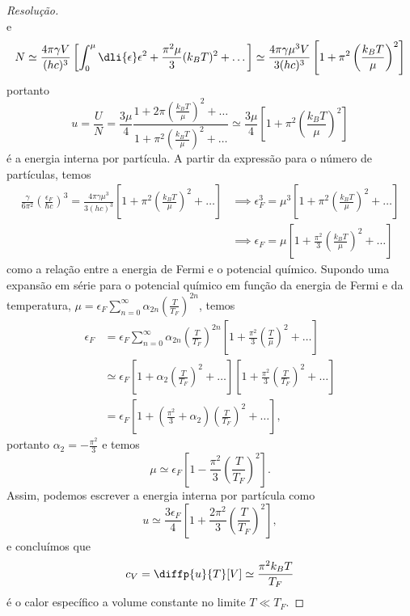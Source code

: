 \begin{proof}[Resolução]
\begin{equation*}
    \end{equation*}
    e
    \begin{equation*}
        N \simeq \frac{4\pi \gamma V}{(hc)^3} \left[\int_0^\mu \dli{\epsilon} \epsilon^2 + \frac{\pi^2\mu}{3} (k_B T)^2 + \dots\right] \simeq \frac{4\pi \gamma \mu^3 V}{3(hc)^3}\left[1 + \pi^2 \left(\frac{k_BT}{\mu}\right)^2\right]
    \end{equation*}
    portanto
    \begin{equation*}
        u = \frac{U}{N} = \frac{3\mu}{4}\frac{1 + 2\pi\left(\frac{k_B T}{\mu}\right)^2 + \dots}{1 + \pi^2\left(\frac{k_B T}{\mu}\right)^2 + \dots} \simeq \frac{3\mu}{4} \left[1 + \pi^2 \left(\frac{k_B T}{\mu}\right)^2\right]
    \end{equation*}
    é a energia interna por partícula. A partir da expressão para o número de partículas, temos
    \begin{align*}
        \frac{\gamma}{6\pi^2}\left(\frac{\epsilon_F}{\hbar c}\right)^3 = \frac{4\pi \gamma \mu^3}{3(hc)^3}\left[1 + \pi^2\left(\frac{k_B T}{\mu}\right)^2 + \dots \right]
        &\implies \epsilon_F^3 = \mu^3 \left[1 + \pi^2\left(\frac{k_B T}{\mu}\right)^2 + \dots\right]\\
        &\implies \epsilon_F =  \mu \left[1 + \frac{\pi^2}{3}\left(\frac{k_B T}{\mu}\right)^2 + \dots\right]
    \end{align*}
    como a relação entre a energia de Fermi e o potencial químico. Supondo uma expansão em série para o potencial químico em função da energia de Fermi e da temperatura, \(\mu = \epsilon_F \sum_{n = 0}^\infty \alpha_{2n} \left(\frac{T}{T_F}\right)^{2n}\), temos
    \begin{align*}
        \epsilon_F &= \epsilon_F\sum_{n = 0}^\infty \alpha_{2n} \left(\frac{T}{T_F}\right)^{2n}\left[1 + \frac{\pi^2}{3}\left(\frac{T}{\mu}\right)^2 + \dots\right]\\
                   &\simeq \epsilon_F\left[1 + \alpha_2 \left(\frac{T}{T_F}\right)^2 + \dots\right]\left[1 + \frac{\pi^2}{3}\left(\frac{T}{T_F}\right)^2 + \dots \right]\\
                   &= \epsilon_F\left[1 + \left(\frac{\pi^2}{3} + \alpha_2\right)\left(\frac{T}{T_F}\right)^2 + \dots \right],
    \end{align*}
    portanto \(\alpha_2 =-\frac{\pi^2}{3}\) e temos
    \begin{equation*}
        \mu \simeq \epsilon_F\left[1 - \frac{\pi^2}{3}\left(\frac{T}{T_F}\right)^2\right].
    \end{equation*}
    Assim, podemos escrever a energia interna por partícula como
    \begin{equation*}
        u \simeq \frac{3 \epsilon_F}{4}\left[1 + \frac{2\pi^2}{3}\left(\frac{T}{T_F}\right)^2\right],
    \end{equation*}
    e concluímos que
    \begin{equation*}
        c_V = \diffp{u}{T}[V] \simeq \frac{\pi^2 k_B T}{T_F}
    \end{equation*}
    é o calor específico a volume constante no limite \(T \ll T_F\).
\end{proof}
